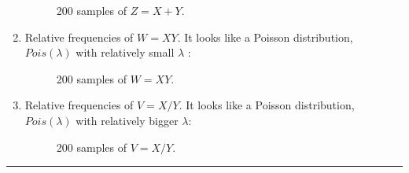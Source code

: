 \documentclass[12pt, letterpaper]{scrartcl}
\begin{document}
\begin{enumerate}[((a))]
        \begin{figure}[h!]
            \centering
            \caption{200 samples of $Z=X+Y$.}
        \end{figure}
        \clearpage
        \item Relative frequencies of $W=XY$. It looks like a Poisson distribution, $Pois(\lambda)$ with relatively small $\lambda$ :
        \begin{figure}[h!]
            \centering
            \caption{200 samples of $W=XY$.}
        \end{figure}
        \clearpage
        \item Relative frequencies of $V=X/Y$. It looks like a Poisson distribution, $Pois(\lambda)$ with relatively bigger $\lambda$:
        \begin{figure}[h!]
            \centering
            \caption{200 samples of $V=X/Y$.}
        \end{figure}
    \end{enumerate}
\hrule
\clearpage
\end{document}
